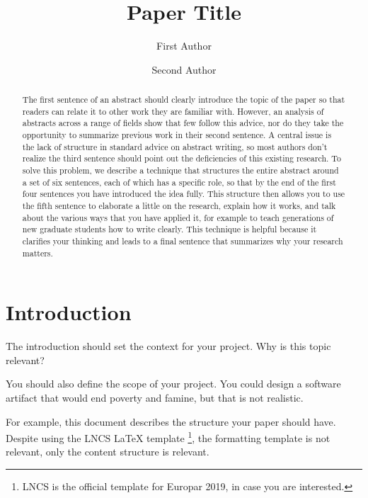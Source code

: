 \documentclass[runningheads]{llncs}
\begin{document}
\title{Paper Title}
\author{First Author \and
Second Author
}


\maketitle

\begin{abstract}
The first sentence of an abstract should clearly introduce the topic of the paper so that readers can relate it to other work they are familiar with. However, an analysis of abstracts across a range of fields show that few follow this advice, nor do they take the opportunity to summarize previous work in their second sentence. A central issue is the lack of structure in standard advice on abstract writing, so most authors don’t realize the third sentence should point out the deficiencies of this existing research. To solve this problem, we describe a technique that structures the entire abstract around a set of six sentences, each of which has a specific role, so that by the end of the first four sentences you have introduced the idea fully. This structure then allows you to use the fifth sentence to elaborate a little on the research, explain how it works, and talk about the various ways that you have applied it, for example to teach generations of new graduate students how to write clearly. This technique is helpful because it clarifies your thinking and leads to a final sentence that summarizes why your research matters.

\end{abstract}
%
%
%
\section{Introduction}


The introduction should set the context for your project. Why is this topic relevant?

You should also define the scope of your project. You could design a software artifact that would end poverty and famine, but that is not realistic.

For example, this document describes the structure your paper should have. Despite using the LNCS LaTeX template \footnote{LNCS is the official template for Europar 2019, in case you are interested.}, the formatting template is not relevant, only the content structure is relevant.
\end{document}
